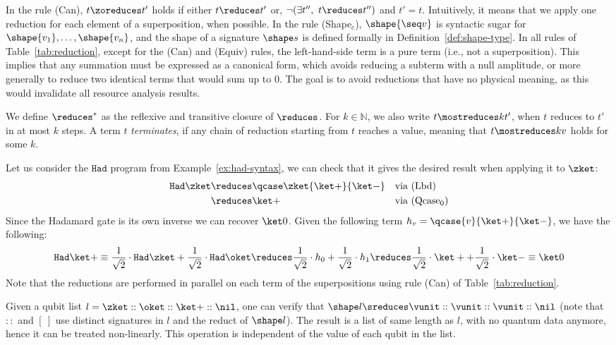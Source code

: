 In the rule (Can), $t\zoreduces t'$  holds if either $t\reduces t'$
or, $\neg(\exists t'',\ t \reduces t'')$ and $t' = t$. Intuitively,
it means that we apply one reduction for each element of a
superposition, when possible.
In the rule (Shape$_c$), $\shape{\seq v}$ is syntactic sugar for $\shape{v_1},
\dots, \shape{v_n}$, and the shape of a signature $\shape s$ is defined
formally in Definition~\ref{def:shape-type}.
In all rules of Table~\ref{tab:reduction}, except for the (Can) and
(Equiv) rules, the left-hand-side term is a pure term (i.e., not a
superposition). This implies that any summation must be
expressed as a canonical form, which avoids reducing
a subterm with a null amplitude, or more generally to reduce two
identical terms that would sum up to $0$.  The goal is to avoid
reductions that have no physical meaning, as this would invalidate
all resource analysis results.

We define $\reduces^*$ as the reflexive and transitive closure of
$\reduces$.
For $k \in \mathbb{N}$, we also write $t \mostreduces k t'$, when $t$
reduces to $t'$ in at most $k$ steps.
A term $t$ \emph{terminates}, if any chain of reduction starting
from $t$ reaches a value, meaning that $t \mostreduces k v$ holds for some $k$.

\begin{example}
  \label{ex:had-semantics}
  Let us consider the $\mathtt{Had}$ program from Example~\ref{ex:had-syntax},
  we can check that it gives the desired result when applying it to $\zket$:
  \[
    \begin{aligned}
      \mathtt{Had} \zket &\reduces \qcase \zket {\ket +}{\ket -}
      &&\text{via (Lbd)} \\
      &\reduces \ket + &&\text{via (Qcase$_0$)}
    \end{aligned}
  \]
  Since the Hadamard gate is its own inverse we can recover $\ket0$.
  Given the following term  $h_v= \qcase{v} {\ket+}{\ket -}$,
  we have the following:
  \[
    \mathtt{Had} \ket + \equiv \frac 1 {\sqrt 2} \cdot \mathtt{Had} \zket +
    \frac 1 {\sqrt 2} \cdot \mathtt{Had} \oket
    \reduces \frac{1}{\sqrt 2} \cdot h_0
    + \frac{1}{\sqrt 2} \cdot h_1 \reduces \frac{1}{\sqrt 2} \cdot \ket + +
    \frac{1}{\sqrt 2} \cdot \ket - \equiv \ket 0
  \]
  Note that the reductions are performed in parallel on each term of the
  superpositions using rule (Can) of Table~\ref{tab:reduction}.
 \end{example}

\begin{example}
  \label{ex:shape-semantics}
  Given a qubit list $l = \zket :: \oket :: \ket + :: \nil$, one can verify that
  $\shape l \sreduces \vunit :: \vunit :: \vunit :: \nil$ (note that $::$ and
  $[\ ]$ use distinct signatures in $l$ and the reduct of $\shape l $).  The
  result is a list of same length as $l$, with no quantum data anymore, hence
  it can be treated non-linearly. This operation is independent of the value of
  each qubit in the list.
\end{example}

